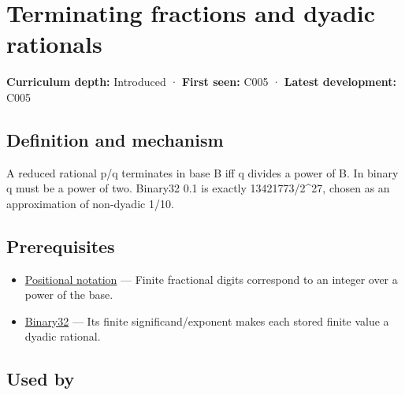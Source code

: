 \hypertarget{appendix-2a2f1b74bdd3}{}\label{referencestart:appendix-2a2f1b74bdd3}
\section{Terminating fractions and dyadic rationals}\label{appendix-2a2f1b74bdd3-terminating-fractions-and-dyadic-rationals}

\hypertarget{appendix-2a2f1b74bdd3-terminating-fractions-and-dyadic-rationals}{}

\textbf{Curriculum depth:} Introduced · \textbf{First seen:} C005 · \textbf{Latest development:} C005

\begin{allmightroledefinition}

\subsection{Definition and mechanism}\label{appendix-2a2f1b74bdd3-definition-and-mechanism}

\hypertarget{appendix-2a2f1b74bdd3-definition-and-mechanism}{}

A reduced rational p/q terminates in base B iff q divides a power of B. In binary q must be a power of two. Binary32 0.1 is exactly 13421773/2\^{}27, chosen as an approximation of non-dyadic 1/10.

\end{allmightroledefinition}

\subsection{Prerequisites}\label{appendix-2a2f1b74bdd3-prerequisites}

\hypertarget{appendix-2a2f1b74bdd3-prerequisites}{}

\begin{itemize}
\tightlist
\item
  \hyperref[appendix-83c3f28f7bda]{Positional notation} --- Finite fractional digits correspond to an integer over a power of the base.
\item
  \hyperref[appendix-5057f9ad327f]{Binary32} --- Its finite significand/exponent makes each stored finite value a dyadic rational.
\end{itemize}

\subsection{Used by}\label{appendix-2a2f1b74bdd3-used-by}

